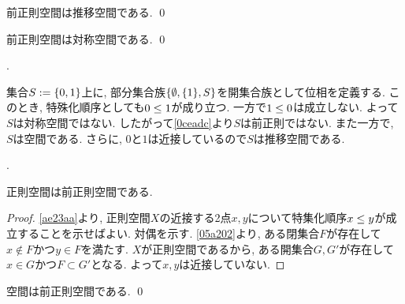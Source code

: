 \documentclass[uplatex, dvipdfmx, a4paper, 12pt, class=jsbook, crop=false]{standalone}
\begin{document}
\begin{proposition}
	前正則空間は推移空間である.
	\qed
\end{proposition}

\begin{proposition}
	\label{0ceadc}
	前正則空間は対称空間である.
	\qed
\end{proposition}

\begin{example}[\Sierpinski 空間]
	\WIP.

	集合\(S \defeq \lrbrace{0, 1}\)上に,
	部分集合族\(\lrbrace{\emptyset, \lrbrace{1}, S}\)を開集合族として位相を定義する.
	このとき, 特殊化順序としても\(0 \leq 1\)が成り立つ.
	一方で\(1 \leq 0\)は成立しない.
	よって\(S\)は対称空間ではない.
	したがって\cref{0ceadc}より\(S\)は前正則ではない.
	また一方で, \(S\)は空間である.
	さらに, \(0\)と\(1\)は近接しているので\(S\)は推移空間である.
\end{example}

\begin{example}[推移空間かつ対称空間であるが前正則ではない空間]
	\WIP.
\end{example}

\begin{proposition}
	正則空間は前正則空間である.
\end{proposition}

\begin{proof}
	\cref{ae23aa}より,
	正則空間\(X\)の近接する2点\(x, y\)について特集化順序\(x \leq y\)が成立することを示せばよい.
	対偶を示す.
	\cref{05a202}より,
	ある閉集合\(F\)が存在して\(x \not\in F\)かつ\(y \in F\)を満たす.
	\(X\)が正則空間であるから,
	ある開集合\(G, G'\)が存在して\(x \in G\)かつ\(F \subset G'\)となる.
	よって\(x, y\)は近接していない.
\end{proof}

\begin{proposition}
	\Hausdorff 空間は前正則空間である.
	\qed
\end{proposition}
\end{document}
